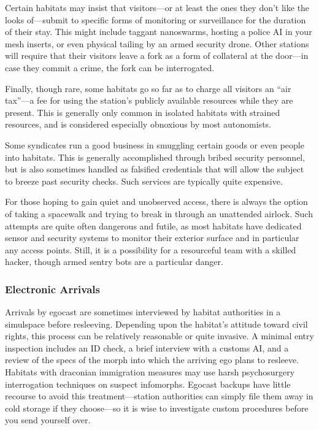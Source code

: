 Certain habitats may insist that visitors—or at least the ones they don't like the looks of—submit to specific forms of monitoring or surveillance for the duration of their stay. This might include taggant nanoswarms, hosting a police AI in your mesh inserts, or even physical tailing by an armed security drone. Other stations will require that their visitors leave a fork as a form of collateral at the door—in case they commit a crime, the fork can be interrogated. 



Finally, though rare, some habitats go so far as to charge all visitors an ``air tax''—a fee for using the station's publicly available resources while they are present. This is generally only common in isolated habitats with strained resources, and is considered especially obnoxious by most autonomists. 

Some syndicates run a good business in smuggling certain goods or even people into habitats. This is generally accomplished through bribed security personnel, but is also sometimes handled as falsified credentials that will allow the subject to breeze past security checks. Such services are typically quite expensive. 

For those hoping to gain quiet and unobserved access, there is always the option of taking a spacewalk and trying to break in through an unattended airlock. Such attempts are quite often dangerous and futile, as most habitats have dedicated sensor and security systems to monitor their exterior surface and in particular any access points. Still, it is a possibility for a resourceful team with a skilled hacker, though armed sentry bots are a particular danger. 

\subsubsection{Electronic Arrivals} 

Arrivals by egocast are sometimes interviewed by habitat authorities in a simulspace before resleeving. Depending upon the habitat's attitude toward civil rights, this process can be relatively reasonable or quite invasive. A minimal entry inspection includes an ID check, a brief interview with a customs AI, and a review of the specs of the morph into which the arriving ego plans to resleeve. Habitats with draconian immigration measures may use harsh psychosurgery interrogation techniques on suspect infomorphs. Egocast backups have little recourse to avoid this treatment—station authorities can simply file them away in cold storage if they choose—so it is wise to investigate custom procedures before you send yourself over. 


